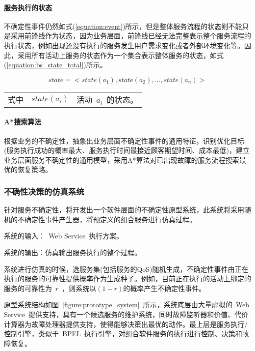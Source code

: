 \paragraph{服务执行的状态} 
不确定性事件仍然如式(\ref{equation:event})所示，但是整体服务流程的状态则不能只是采用前锋线作为状态，因为业务层面，前锋线已经无法完整表示整个服务流程的执行状态，例如出现还没有执行的服务发生用户需求变化或者外部环境变化等。因此，采用所有活动上服务的状态作为一个集合表示整体服务的状态，如式(\ref{equation:bs_state_total})所示。

\begin{equation}\label{equation:bs_state_total}
state = < state(a_1),state(a_2),..., state(a_n)>
\end{equation}
\begin{tabularx}{\textwidth}{@{}l@{\quad}l@{\pozhehao }X@{}}
    式中
    & $state(a_i)$ & 活动~$a_i$~的状态。
\end{tabularx}\vspace{\wordsep}

\paragraph{A*搜索算法}

根据业务的不确定性，抽象出业务层面不确定性事件的通用特征，识别优化目标(服务执行成功的概率最大、服务执行时间最接近顾客期望时间、成本最低)，建立业务层面服务不确定性的通用模型，采用A*算法对已出现故障的服务流程搜索最优的恢复策略。

\subsubsection{不确性决策的仿真系统}

针对服务不确定性，将开发出一个软件层面的不确定性原型系统，此系统将采用随机的不确定性事件产生器，将预定义的组合服务进行仿真过程。

系统的输入：~Web Service~执行方案。

系统的输出：仿真输出服务执行的整个过程。

系统进行仿真的时候，选服务集(包括服务的QoS)随机生成，不确定性事件由正在执行的服务的可靠性提供概率作为生成种子。例如，目前正在执行的活动上绑定的服务的可靠性为~$r$~，则系统以$(1-r)$的概率产生不确定性事件。

原型系统结构如图~\ref{figure:prototype_system}~所示，系统底层由大量虚拟的~Web Service~提供支持，具有一个候选服务的维护系统，同时故障监听器和价值、代价计算器为故障处理器提供支持，使得能够决策出最优的动作。最上层是服务执行/控制引擎，类似于~BPEL~执行引擎，对组合软件服务的执行进行控制、决策和故障恢复。

